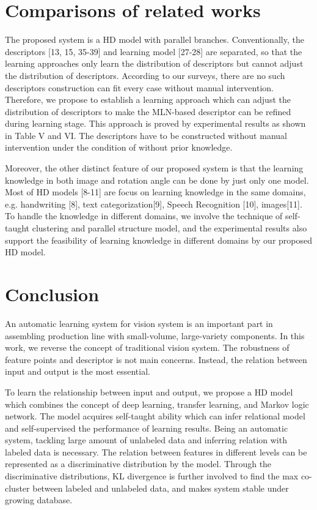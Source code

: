 \documentclass[journal]{IEEEtran}
\begin{document}
\section{Comparisons of related works}
The proposed system is a HD model with parallel branches. Conventionally, the descriptors [13, 15, 35-39] and learning model [27-28] are separated, so that the learning approaches only learn the distribution of descriptors but cannot adjust the distribution of descriptors. According to our surveys, there are no such descriptors construction can fit every case without manual intervention. Therefore, we propose to establish a learning approach which can adjust the distribution of descriptors to make the MLN-based descriptor can be refined during learning stage. This approach is proved by experimental results as shown in Table V and VI. The descriptors have to be constructed without manual intervention under the condition of without prior knowledge. 

Moreover, the other distinct feature of our proposed system is that the learning knowledge in both image and rotation angle can be done by just only one model. Most of HD models [8-11] are focus on learning knowledge in the same domains, e.g.  handwriting [8], text categorization[9], Speech Recognition [10], images[11]. To handle the knowledge in different domains, we involve the technique of self-taught clustering and parallel structure model, and the experimental results also support the feasibility of learning knowledge in different domains by our proposed HD model.

\section{Conclusion}
An automatic learning system for vision system is an important part in assembling production line with small-volume, large-variety components. In this work, we reverse the concept of traditional vision system. The robustness of feature points and descriptor is not main concerns. Instead, the relation between input and output is the most essential. 

To learn the relationship between input and output, we propose a HD model which combines the concept of deep learning, transfer learning, and Markov logic network. The model acquires self-taught ability which can infer relational model and self-supervised the performance of learning results. Being an automatic system, tackling large amount of unlabeled data and inferring relation with labeled data is necessary. The relation between features in different levels can be represented as a discriminative distribution by the model. Through the discriminative distributions, KL divergence is further involved to find the max co-cluster between labeled and unlabeled data, and makes system stable under growing database. 
\end{document}
